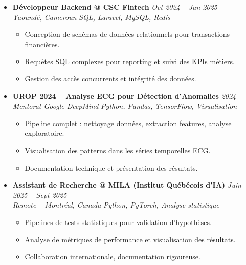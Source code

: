 \documentclass[a4paper,11pt]{article}
\begin{document}
\begin{itemize}[leftmargin=*, label={-}]
\item \textbf{Développeur Backend @ CSC Fintech} \hfill \textit{Oct 2024 -- Jan 2025} \\
\textit{Yaoundé, Cameroun} \hfill \textit{SQL, Laravel, MySQL, Redis}
\vspace{-2pt}
    \begin{itemize}[leftmargin=0.4cm, nosep, label=\tiny$\bullet$]
        \item \small{Conception de schémas de données relationnels pour transactions financières.}
        \item \small{Requêtes SQL complexes pour reporting et suivi des KPIs métiers.}
        \item \small{Gestion des accès concurrents et intégrité des données.}
    \end{itemize}
\vspace{3pt}

\item \textbf{UROP 2024 -- Analyse ECG pour Détection d'Anomalies} \hfill \textit{2024} \\
\textit{Mentorat Google DeepMind} \hfill \textit{Python, Pandas, TensorFlow, Visualisation}
\vspace{-2pt}
    \begin{itemize}[leftmargin=0.4cm, nosep, label=\tiny$\bullet$]
        \item \small{Pipeline complet : nettoyage données, extraction features, analyse exploratoire.}
        \item \small{Visualisation des patterns dans les séries temporelles ECG.}
        \item \small{Documentation technique et présentation des résultats.}
    \end{itemize}
\vspace{3pt}

\item \textbf{Assistant de Recherche @ MILA (Institut Québécois d'IA)} \hfill \textit{Juin 2025 -- Sept 2025} \\
\textit{Remote -- Montréal, Canada} \hfill \textit{Python, PyTorch, Analyse statistique}
\vspace{-2pt}
    \begin{itemize}[leftmargin=0.4cm, nosep, label=\tiny$\bullet$]
        \item \small{Pipelines de tests statistiques pour validation d'hypothèses.}
        \item \small{Analyse de métriques de performance et visualisation des résultats.}
        \item \small{Collaboration internationale, documentation rigoureuse.}
    \end{itemize}
\vspace{3pt}


\end{itemize}
\end{document}
